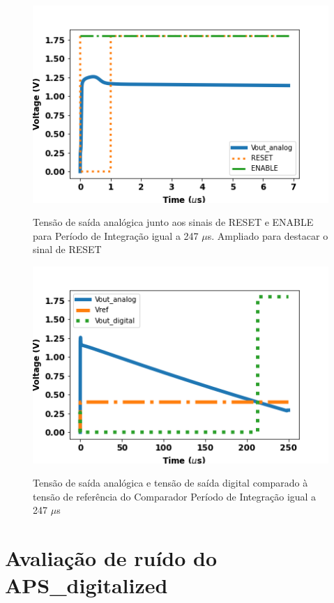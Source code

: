 \begin{figure}[!h]
 \centering
    \centering
    \caption{Tensão de saída analógica junto aos sinais de RESET e ENABLE para Período de Integração igual a 247 $\mu$s. Ampliado para destacar o sinal de RESET}
    \includegraphics[scale=0.6]{Resultados/Graficos/reseteenable-tb_pixel250_zoom.png}
    \label{graf247z}
\end{figure}

\begin{figure}[!h]
 \centering
    \caption{Tensão de saída analógica e tensão de saída digital comparado à tensão de referência do Comparador Período de Integração igual a 247 $\mu$s} 
    \includegraphics[scale=0.6]{Resultados/Graficos/analogicoedigital-tb_pixel250.png}
    \label{graf2472}
\end{figure}

\section{Avaliação de ruído do APS\_digitalized}

